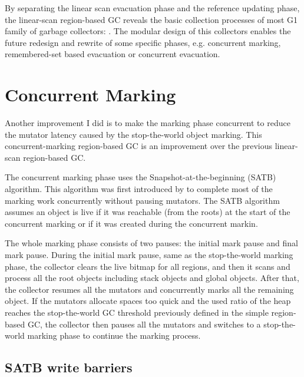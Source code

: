By separating the linear scan evacuation phase and the reference updating phase,
the linear-scan region-based GC reveals the basic collection processes of most G1 family
of garbage collectors: .
The modular design of this collectors enables the future redesign and rewrite of some specific
phases, e.g. concurrent marking, remembered-set based evacuation or concurrent evacuation.

\section{Concurrent Marking}
\label{sec:concmarkgc}

Another improvement I did is to make the marking phase concurrent to reduce the
mutator latency caused by the stop-the-world object marking.
This concurrent-marking region-based GC is an improvement over the previous linear-scan region-based GC.

The concurrent marking phase uses the Snapshot-at-the-beginning (SATB) algorithm.
This algorithm was first introduced by \cite{yuasa1990real} to
complete most of the marking work concurrently without pausing mutators.
The SATB algorithm assumes an object is live if it was reachable (from the roots)
at the start of the concurrent marking or if it was created during the concurrent markin.

The whole marking phase consists of two pauses: the initial mark pause and final mark pause.
During the initial mark pause, same as the stop-the-world marking phase,
the collector clears the live bitmap for all regions,
and then it scans and process all the root objects including stack objects and global objects.
After that, the collector resumes all the mutators and concurrently marks all the remaining object.
If the mutators allocate spaces too quick and the used ratio of the heap reaches
the stop-the-world GC threshold previously defined in the simple region-based GC, the
collector then pauses all the mutators and switches to a stop-the-world marking phase
to continue the marking process.

\subsection{SATB write barriers}

